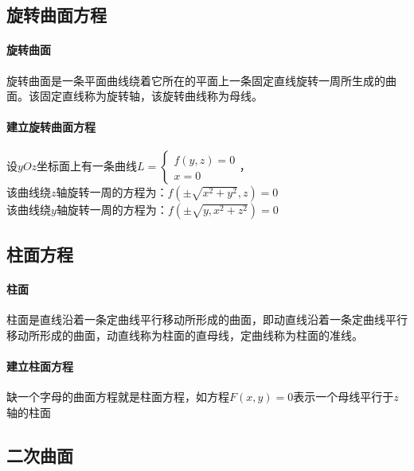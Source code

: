 \documentclass{article}
\begin{document}
\begin{flushleft}
	\subsection{旋转曲面方程}
	
	\paragraph{旋转曲面}
	旋转曲面是一条平面曲线绕着它所在的平面上一条固定直线旋转一周所生成的曲面。该固定直线称为旋转轴，该旋转曲线称为母线。
	
	\paragraph{建立旋转曲面方程}
	设$yOz$坐标面上有一条曲线$L=\left\{
	\begin{array}{lcl}
	f(y,z)=0\\
	x=0
	\end{array} \right.$，\\
	该曲线绕$z$轴旋转一周的方程为：$f(\pm\sqrt{x^2+y^2},z)=0$\\
	该曲线绕$y$轴旋转一周的方程为：$f(\pm\sqrt{y,x^2+z^2})=0$\\
	
	\subsection{柱面方程}
	
	\paragraph{柱面}
	柱面是直线沿着一条定曲线平行移动所形成的曲面，即动直线沿着一条定曲线平行移动所形成的曲面，动直线称为柱面的直母线，定曲线称为柱面的准线。
	
	\paragraph{建立柱面方程}
	缺一个字母的曲面方程就是柱面方程，如方程$F(x,y)=0$表示一个母线平行于$z$轴的柱面\\
	
	\subsection{二次曲面}
	

\end{flushleft}
\end{document}
